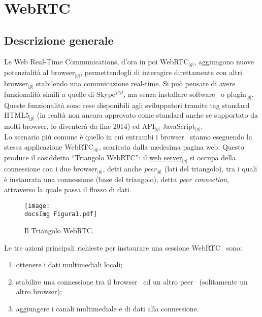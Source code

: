 \appendix
\appendixpage
\addappheadtotoc
\section{WebRTC}{
	\subsection{Descrizione generale} {
		Le Web Real-Time Communications, d’ora in poi WebRTC$_{|g|}$, aggiungono nuove potenzialità al browser$_{|g|}$, 
		permettendogli di interagire direttamente con altri browser$_{|g|}$ stabilendo una comunicazione real-time. 
		Si può pensare di avere funzionalità simili a quelle di Skype$^{TM}$, ma senza installare software\g~ o plugin$_{|g|}$. 
		Queste funzionalità sono rese disponibili agli sviluppatori tramite tag standard HTML5$_{|g|}$ 
		(in realtà non ancora approvato come standard anche se supportato da molti browser\g , lo diventerà da fine 2014) 
		ed API$_{|g|}$ JavaScript$_{|g|}$.\\
		Lo scenario più comune è quello in cui entrambi i browser\g~ stanno eseguendo 
		la stessa applicazione WebRTC$_{|g|}$, scaricata dalla medesima pagina web\g . 
		Questo produce il cosiddetto “Triangolo WebRTC\g ”: il \underline{web server}$_{|g|}$ si occupa della connessione con i due browser$_{|g|}$, 
		detti anche \emph{peer}$_{|g|}$ (lati del triangolo), tra i quali è instaurata una connessione (base del triangolo), 
		detta \emph{peer connection}, attraverso la quale passa il flusso di dati.

		\begin{center}
			\begin{figure}[h]
				\centering
				\texttt{[image: \\docsImg Figura1.pdf]}
			\caption{Il Triangolo WebRTC\g .}	
			\end{figure}
		\end{center}	


		Le tre azioni principali richieste per instaurare una sessione WebRTC\g~ sono:

		\begin{enumerate}
			\item ottenere i dati multimediali locali;
			\item stabilire una connessione tra il browser\g~ ed un altro peer\g~ (solitamente un altro browser\g );
			\item aggiungere i canali multimediale e di dati alla connessione.
		\end{enumerate}

}}
